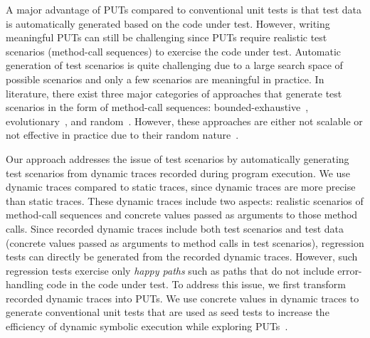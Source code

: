 A major advantage of PUTs compared to conventional unit tests is that test data is automatically generated based on the code under test. However, writing meaningful PUTs
can still be challenging since PUTs require realistic test scenarios (method-call sequences) to exercise the code under test. Automatic generation of test scenarios is quite challenging due to a large search space of possible scenarios and only a few scenarios are meaningful in practice. In literature, there exist three major categories of approaches that generate test scenarios in the form of method-call sequences: bounded-exhaustive~\cite{khurshid:symbolic, xie:rostra}, evolutionary~\cite{inkumsah08:improving, tonella:etoc}, and random~\cite{csallner:jcrasher, JTEST, pacheco:feedback}. However, these approaches are either not scalable or not effective in practice due to their random nature~\cite{thummalapenta09:mseqgen}. 

Our approach addresses the issue of test scenarios by automatically generating test scenarios from dynamic traces recorded during program execution. We use dynamic traces compared to static traces, since dynamic traces are more precise than static traces. These dynamic traces include two aspects: realistic scenarios of method-call sequences and concrete values passed as arguments to those method calls. Since recorded dynamic traces include both test scenarios and test data (concrete values passed as arguments to method calls in test scenarios), regression tests can directly be generated from the recorded dynamic traces. However, such regression tests exercise only \emph{happy paths} such
as paths that do not include error-handling code in the code under test. To address this issue, we first transform recorded dynamic traces into PUTs. We use concrete values in dynamic traces to generate conventional unit tests that are used as seed tests to increase the efficiency of dynamic symbolic execution while exploring PUTs~\cite{patrice08:whitebox}.

